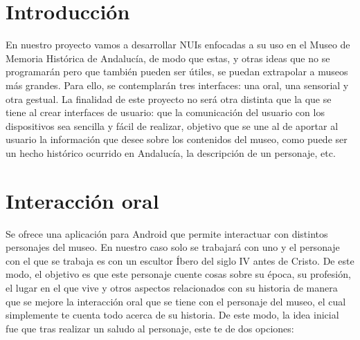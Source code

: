 \documentclass{article}
\begin{document}
\hypersetup{pageanchor=false}
\maketitle
\hypersetup{pageanchor=true}


\setcounter{tocdepth}{2}

\newpage
\tableofcontents
\vspace*{\fill}
\doclicenseThis
\newpage


\section{Introducción}

En nuestro proyecto vamos a desarrollar NUIs enfocadas a su uso en el Museo de Memoria Histórica de Andalucía, de modo que estas, y otras ideas que no se programarán pero que también pueden ser útiles, se puedan extrapolar a museos más grandes. Para ello, se contemplarán tres interfaces: una oral, una sensorial y otra gestual. La finalidad de este proyecto no será otra distinta que la que se tiene al crear interfaces de usuario: que la comunicación del usuario con los dispositivos sea sencilla y fácil de realizar, objetivo que se une al de aportar al usuario la información que desee sobre los contenidos del museo, como puede ser un hecho histórico ocurrido en Andalucía, la descripción de un personaje, etc.

\section{Interacción oral}

Se ofrece una aplicación para Android que permite interactuar con distintos personajes del museo. En nuestro caso solo se trabajará con uno y el personaje con el que se trabaja es con un escultor Íbero del siglo IV antes de Cristo. De este modo, el objetivo es que este personaje cuente cosas sobre su época, su profesión, el lugar en el que vive y otros aspectos relacionados con su historia de manera que se mejore la interacción oral que se tiene con el personaje del museo, el cual simplemente te cuenta todo acerca de su historia. De este modo, la idea inicial fue que tras realizar un saludo al personaje, este te de dos opciones:
\end{document}
